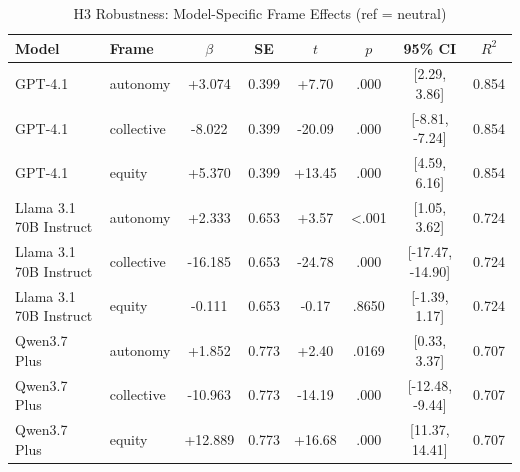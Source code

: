 \begin{table}[ht]
\centering
\caption{H3 Robustness: Model-Specific Frame Effects (ref = neutral)}
\label{tab:h3-model-frame}
\begin{tabular}{llcccccc}
\toprule
Model & Frame & $\beta$ & SE & $t$ & $p$ & 95\% CI & $R^2$ \\
\midrule
GPT-4.1 & autonomy & +3.074 & 0.399 & +7.70 & .000 & [2.29, 3.86] & 0.854 \\
GPT-4.1 & collective & -8.022 & 0.399 & -20.09 & .000 & [-8.81, -7.24] & 0.854 \\
GPT-4.1 & equity & +5.370 & 0.399 & +13.45 & .000 & [4.59, 6.16] & 0.854 \\
\addlinespace
Llama 3.1 70B Instruct & autonomy & +2.333 & 0.653 & +3.57 & <.001 & [1.05, 3.62] & 0.724 \\
Llama 3.1 70B Instruct & collective & -16.185 & 0.653 & -24.78 & .000 & [-17.47, -14.90] & 0.724 \\
Llama 3.1 70B Instruct & equity & -0.111 & 0.653 & -0.17 & .8650 & [-1.39, 1.17] & 0.724 \\
\addlinespace
Qwen3.7 Plus & autonomy & +1.852 & 0.773 & +2.40 & .0169 & [0.33, 3.37] & 0.707 \\
Qwen3.7 Plus & collective & -10.963 & 0.773 & -14.19 & .000 & [-12.48, -9.44] & 0.707 \\
Qwen3.7 Plus & equity & +12.889 & 0.773 & +16.68 & .000 & [11.37, 14.41] & 0.707 \\
\bottomrule
\end{tabular}
\end{table}
